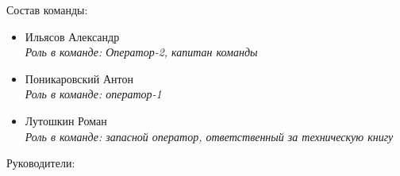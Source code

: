 \large Состав команды:


\begin{itemize}
	\item	Ильясов Александр\\
		\emph{Роль в команде: Оператор-2, капитан команды}
	
	\item	Поникаровский Антон\\
		\emph{Роль в команде: оператор-1}
	\item	Лутошкин Роман\\
		\emph{Роль в команде: запасной оператор, ответственный за техническую книгу}
		
\end{itemize}


\newpage

\large Руководители:


